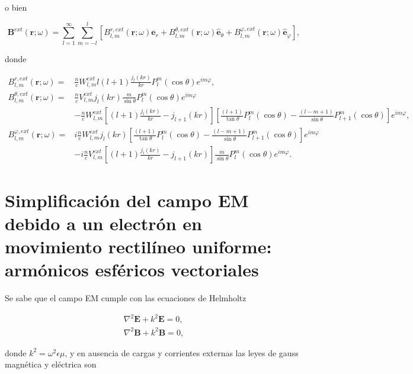 \documentclass[a4paper,10pt]{article}
\newcommand{\hatbf}[1] {\hat{\mathbf{#1}}}	%
\begin{document}
o bien

\begin{equation}
\textbf{B}^{ext}(\textbf{r};\omega)=\sum_{l=1}^{\infty}\sum_{m=-l}^l	\left[		B_{l,m}^{r,ext}(\textbf{r};\omega)\hatbf{e}_r+B_{l,m}^{\theta,ext}(\textbf{r};\omega)\hatbf{e}_{\theta}+B_{l,m}^{\varphi,ext}(\textbf{r};\omega)\hatbf{e}_{\varphi}	\right],
\end{equation}

donde

\begin{subequations}
\begin{align}
B_{l,m}^{r,ext}(\textbf{r};\omega)	=&	\frac{n}{c}W_{l,m}^{ext}l(l+1)\frac{j_l(kr)}{kr}P_l^m(\cos\theta)e^{im\varphi},	\\
B_{l,m}^{\theta,ext}(\textbf{r};\omega)	=&	\frac{n}{c}V_{l,m}^{ext} j_l(kr)\frac{m}{\sin\theta}P_l^m(\cos\theta)e^{im\varphi}	\\
&-\frac{n}{c}W_{l,m}^{ext}\left[ (l+1)\frac{j_l(kr)}{kr} -j_{l+1}(kr)\right]\left[\frac{(l+1)}{\tan\theta}P_l^m(\cos\theta) -\frac{(l-m+1)}{\sin\theta}P_{l+1}^m(\cos\theta)\right]e^{im\varphi},	\\
B_{l,m}^{\varphi,ext}(\textbf{r};\omega)	=&	i\frac{n}{c}W_{l,m}^{ext}j_l(kr)\left[\frac{(l+1)}{\tan\theta}P_l^m(\cos\theta)-\frac{(l-m+1)}{\sin\theta}P_{l+1}^m(\cos\theta)\right]e^{im\varphi}	\\
&-i\frac{n}{c}V_{l,m}^{ext}\left[ (l+1)\frac{j_l(kr)}{kr} -j_{l+1}(kr)\right]\frac{m}{\sin\theta}P_l^m(\cos\theta) e^{im\varphi}.
\end{align}
\end{subequations}

\section{\large{Simplificación del campo EM debido a un electrón en movimiento rectilíneo uniforme: armónicos esféricos vectoriales}}

\setcounter{equation}{0}

Se sabe que el campo EM cumple con las ecuaciones de Helmholtz

\begin{subequations}
\begin{align}
\nabla^2\textbf{E}+k^2\textbf{E}=0,	\\
\nabla^2\textbf{B}+k^2\textbf{B}=0,
\end{align}
\label{Eq5.1}
\end{subequations}

donde $k^2=\omega^2\epsilon\mu$, y en ausencia de cargas y corrientes externas las leyes de gauss magnética y eléctrica son
\end{document}
